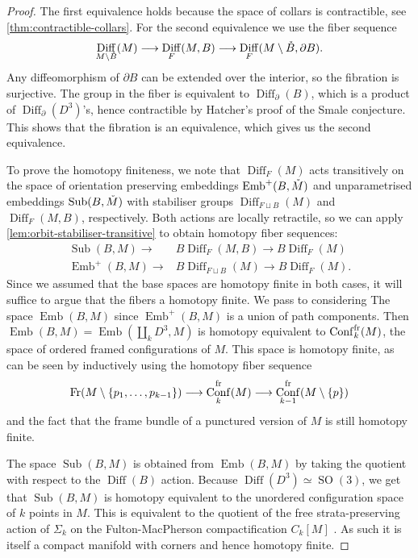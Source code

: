 \documentclass{amsart}
\theoremstyle{plain}
\theoremstyle{definition}
\DeclareMathOperator\Diff{Diff}
\DeclareMathOperator\emb{Emb}
\DeclareMathOperator\Conf{Conf}
\DeclareMathOperator\SO{SO}
\DeclareMathOperator\Fr{Fr}
\DeclareMathOperator{\umb}{Sub} %
\newcommand{\interior}[1]{\smash{\mathring{#1}}}
\newcommand{\BDiff}{B\!\Diff}
\begin{document}
\begin{proof}
    The first equivalence holds because the space of collars is contractible, see \cref{thm:contractible-collars}.
    For the second equivalence we use the fiber sequence
    \[
        \Diff_{M\setminus \interior{B}}(M) \longrightarrow \Diff_F(M, B) \longrightarrow \Diff_F(M\setminus \interior{B}, \partial B).
    \]
    Any diffeomorphism of $\partial B$ can be extended over the interior, so the fibration is surjective.
    The group in the fiber is equivalent to $\Diff_\partial(B)$, which is a product of $\Diff_\partial(D^3)$'s, hence  contractible by Hatcher's proof of the Smale conjecture.
    This shows that the fibration is an equivalence, which gives us the second equivalence.

    To prove the homotopy finiteness, we note that $\Diff_F(M)$ acts transitively on the space of orientation preserving embeddings $\emb^+(B, \interior{M})$ and unparametrised embeddings $\umb(B, \interior{M})$ with stabiliser groups $\Diff_{F\sqcup B}(M)$ and $\Diff_F(M, B)$, respectively.
    Both actions are locally retractile, so we can apply \cref{lem:orbit-stabiliser-transitive} to obtain homotopy fiber sequences:
    \begin{align*}
        \umb(B, M) \longrightarrow
        & \BDiff_F(M, B) \longrightarrow \BDiff_F(M)\\
         \emb^+(B, M) \longrightarrow
        &\BDiff_{F\sqcup B}(M) \longrightarrow \BDiff_F(M). 
    \end{align*}
    Since we assumed that the base spaces are homotopy finite in both cases, it will suffice to argue that the fibers a homotopy finite.
    We pass to considering 
    The space $\emb(B, M)$ since $\emb^+(B, M)$ is a union of path components. Then
    $\emb(B, M) = \emb(\amalg_k D^3, M)$ is homotopy equivalent to $\Conf_{k}^{\rm fr}(M)$, the space of ordered framed configurations of $M$. 
    This space is homotopy finite, as can be seen by inductively using the homotopy fiber sequence
    \[
        \Fr(M \setminus \{p_1, \dots, p_{k-1}\}) \longrightarrow
        \Conf_{k}^{\rm fr}(M) \longrightarrow
        \Conf_{k-1}^{\rm fr}(M \setminus \{p\}) 
    \]
    and the fact that the frame bundle of a punctured version of $M$ is still homotopy finite.
    
    The space $\umb(B, M)$ is obtained from $\emb(B, M)$ by taking the quotient with respect to the $\Diff(B)$ action.
    Because $\Diff(D^3) \simeq \SO(3)$, we get that $\umb(B, M)$ is homotopy equivalent to the unordered configuration space of $k$ points in $M$. 
    This is equivalent to the quotient of the free strata-preserving action of $\Sigma_k$ on the Fulton-MacPherson compactification $C_k[M]$ \cite[Theorem 4.10]{Sinha04}.
    As such it is itself a compact manifold with corners and hence homotopy finite.
\end{proof}
\end{document}
